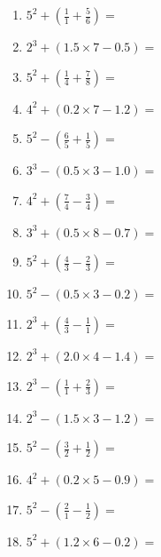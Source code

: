 \documentclass[12pt]{article}
\begin{document}
\begin{enumerate}
\item \large $ 5^{2} + (\frac{1}{1} + \frac{5}{6}) = $ \vspace{1.6cm}
\item \large $ 2^{3} + (1.5 \times 7 - 0.5) = $ \vspace{1.6cm}
\item \large $ 5^{2} + (\frac{1}{4} + \frac{7}{8}) = $ \vspace{1.6cm}
\item \large $ 4^{2} + (0.2 \times 7 - 1.2) = $ \vspace{1.6cm}
\newpage
\item \large $ 5^{2} - (\frac{6}{5} + \frac{1}{5}) = $ \vspace{1.6cm}
\item \large $ 3^{3} - (0.5 \times 3 - 1.0) = $ \vspace{1.6cm}
\item \large $ 4^{2} + (\frac{7}{4} - \frac{3}{4}) = $ \vspace{1.6cm}
\item \large $ 3^{3} + (0.5 \times 8 - 0.7) = $ \vspace{1.6cm}
\item \large $ 5^{2} + (\frac{4}{3} - \frac{2}{3}) = $ \vspace{1.6cm}
\item \large $ 5^{2} - (0.5 \times 3 - 0.2) = $ \vspace{1.6cm}
\item \large $ 2^{3} + (\frac{4}{3} - \frac{1}{1}) = $ \vspace{1.6cm}
\item \large $ 2^{3} + (2.0 \times 4 - 1.4) = $ \vspace{1.6cm}
\item \large $ 2^{3} - (\frac{1}{1} + \frac{2}{3}) = $ \vspace{1.6cm}
\item \large $ 2^{3} - (1.5 \times 3 - 1.2) = $ \vspace{1.6cm}
\newpage
\item \large $ 5^{2} - (\frac{3}{2} + \frac{1}{2}) = $ \vspace{1.6cm}
\item \large $ 4^{2} + (0.2 \times 5 - 0.9) = $ \vspace{1.6cm}
\item \large $ 5^{2} - (\frac{2}{1} - \frac{1}{2}) = $ \vspace{1.6cm}
\item \large $ 5^{2} + (1.2 \times 6 - 0.2) = $ \vspace{1.6cm}

\end{enumerate}
\end{document}
